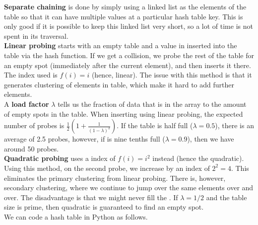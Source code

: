 \documentclass[]{article}
\begin{document}
\textbf{Separate chaining} is done by simply using a linked list as the elements of the table so that it can have multiple values at a particular hash table key. This is only good if it is possible to keep this linked list very short, so a lot of time is not spent in its traversal.\\

\textbf{Linear probing} starts with an empty table and a value in inserted into the table via the hash function. If we get a collision, we probe the rest of the table for an empty spot (immediately after the current element), and then inserts it there. The index used is $f(i) = i$ (hence, linear).  The issue with this method is that it generates clustering of elements in table, which make it hard to add further elements. \\

A \textbf{load factor} $\lambda$ tells us the fraction of data that is in the array to the amount of empty spots in the table. When inserting using linear probing, the expected number of probes is $\frac{1}{2}\left( 1 + \frac{1}{(1-\lambda)^2} \right)$. If the table is half full ($\lambda = 0.5$), there is an average of 2.5 probes, however, if is nine tenths full ($\lambda = 0.9$), then we have around 50 probes.\\


\textbf{Quadratic probing} uses a index of $f(i) = i^2$ instead (hence the quadratic). Using this method, on the second probe, we increase by an index of $2^2 = 4$. This eliminates the primary clustering from linear probing. There is, however, secondary clustering, where we continue to jump over the same elements over and over. The disadvantage is that we might never fill the . If $\lambda = 1/2$ and the table size is prime, then quadratic is guaranteed to find an empty spot.\\

We can code a hash table in Python as follows.
\end{document}
